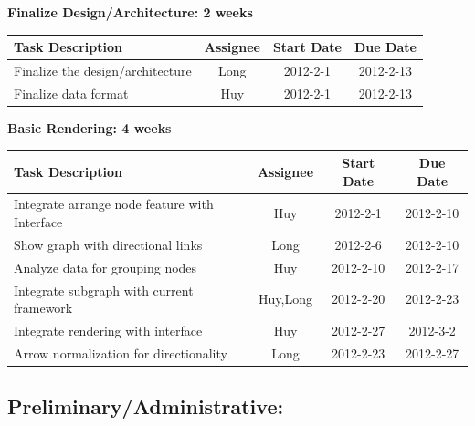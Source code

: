\documentclass[12pt, letterpaper]{article}
\begin{document}
  \begin{center}
		{\bf Finalize Design/Architecture: 2 weeks}
    \begin{tabular}{|p{8.3cm} || c | c | c | }
      \hline
      Task Description & Assignee & Start Date & Due Date \\
      \hline
	    Finalize the design/architecture & Long & 2012-2-1 & 2012-2-13 \\
	    Finalize data format  & Huy & 2012-2-1 & 2012-2-13 \\
      \hline
    \end{tabular}
  \end{center}

  \begin{center}
		{\bf Basic Rendering: 4 weeks}
    \begin{tabular}{| p{8.3cm} || c | c | c | }
      \hline
      Task Description & Assignee & Start Date & Due Date \\
      \hline
	    Integrate arrange node feature with Interface & Huy & 2012-2-1 & 2012-2-10 \\
            Show graph with directional links & Long & 2012-2-6 &  2012-2-10 \\
            Analyze data for grouping nodes & Huy & 2012-2-10 & 2012-2-17 \\
            Integrate subgraph with current framework & Huy,Long & 2012-2-20 & 2012-2-23 \\
            Integrate rendering with interface  & Huy & 2012-2-27 & 2012-3-2 \\  
            Arrow normalization for directionality  & Long & 2012-2-23 & 2012-2-27 \\
      \hline
    \end{tabular}
  \end{center}


	\subsection{Preliminary/Administrative:}
\end{document}
